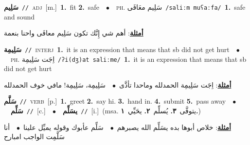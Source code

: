 \documentclass[10pt,a4paper,twoside]{article} %
\begin{document}
\begin{multicols}{2}
{\setlength\topsep{0pt}\textbf{\foreignlanguage{arabic}{سَلِيم}}\ {\color{gray}\texttt{//}\color{black}}\ \textsc{adj}\ [m.]\ \textbf{1.}~fit  \textbf{2.}~safe\ \ $\bullet$\ \ \textsc{ph.} \color{gray} \foreignlanguage{arabic}{سَلِيم معَافَى}\color{black}\ {\color{gray}\texttt{/{\sffamily saliːm muʕaːfa}/}\color{black}}\ \textbf{1.}~safe and sound\  \begin{flushright}\color{gray}\foreignlanguage{arabic}{\textbf{\underline{\foreignlanguage{arabic}{أمثلة}}}: أهم شي إِنَّك تكون سَلِيم معافَى واحنا بنعمة}\end{flushright}\color{black}} \vspace{2mm}

{\setlength\topsep{0pt}\textbf{\foreignlanguage{arabic}{سَلِيمِة}}\ {\color{gray}\texttt{//}\color{black}}\ \textsc{interj}\ \textbf{1.}~it is an expression that means that sb did not get hurt\ \ $\bullet$\ \ \textsc{ph.} \color{gray} \foreignlanguage{arabic}{اِجَت سَلِيمِة}\color{black}\ {\color{gray}\texttt{/{\sffamily ʔi(dʒ)at saliːme}/}\color{black}}\ \textbf{1.}~it is an expression that means that sb did not get hurt\  \begin{flushright}\color{gray}\foreignlanguage{arabic}{\textbf{\underline{\foreignlanguage{arabic}{أمثلة}}}: اِجَت سَلِيمِة الحمدلله وماحدا تأذَّى\ $\bullet$\ \  سَلِيمِة، سَلِيمِة! مافي خوف الحمدلله}\end{flushright}\color{black}} \vspace{2mm}

{\setlength\topsep{0pt}\textbf{\foreignlanguage{arabic}{سَلَّم}}\ {\color{gray}\texttt{//}\color{black}}\ \textsc{verb}\ [p.]\ \textbf{1.}~greet  \textbf{2.}~say hi.  \textbf{3.}~hand in.  \textbf{4.}~submit  \textbf{5.}~pass away\ \ $\bullet$\ \ \setlength\topsep{0pt}\textbf{\foreignlanguage{arabic}{سَلِّم}}\ {\color{gray}\texttt{//}\color{black}}\ [c.]\ \ $\bullet$\ \ \setlength\topsep{0pt}\textbf{\foreignlanguage{arabic}{يسَلِّم}}\ {\color{gray}\texttt{//}\color{black}}\ [i.]\ \color{gray}(msa. \foreignlanguage{arabic}{يتوفَّى}~\foreignlanguage{arabic}{\textbf{٣.}}  \foreignlanguage{arabic}{يُسلِّم}~\foreignlanguage{arabic}{\textbf{٢.}}  \foreignlanguage{arabic}{يحَيِّي}~\foreignlanguage{arabic}{\textbf{١.}})\color{black}\  \begin{flushright}\color{gray}\foreignlanguage{arabic}{\textbf{\underline{\foreignlanguage{arabic}{أمثلة}}}: خلاص أبوها بده يسَلِّم الله يصبرهم\ $\bullet$\ \  سَلِّم عأبوك وقوله يميِّل علينا\ $\bullet$\ \  أنا سَلَّمِت الواجب امبارح}\end{flushright}\color{black}} \vspace{2mm}


\end{multicols}
\end{document}
